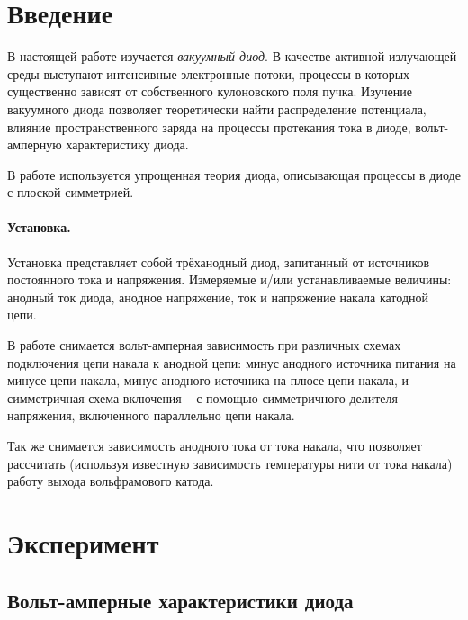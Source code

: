\documentclass[a5paper,11pt]{extarticle}
\begin{document}


\tableofcontents
\newpage



\section*{Введение}
\vspace{-0.5em}
В настоящей работе изучается \textit{вакуумный диод}. В качестве активной излучающей среды выступают интенсивные электронные потоки, процессы в которых существенно зависят от собственного кулоновского поля пучка. Изучение вакуумного диода позволяет теоретически найти распределение потенциала, влияние пространственного заряда на процессы протекания тока в диоде, вольт-амперную характеристику диода. 

В работе используется упрощенная теория диода, описывающая процессы в диоде с плоской симметрией.



\vspace{-0.5em}

\paragraph{Установка.} Установка представляет собой трёханодный диод, запитанный от источников постоянного тока и напряжения. Измеряемые и/или устанавливаемые величины: анодный ток диода, анодное напряжение, ток и напряжение накала катодной цепи.

В работе снимается вольт-амперная зависимость при различных схемах подключения цепи накала к анодной цепи: минус анодного источника питания на минусе цепи накала, минус анодного источника на плюсе цепи накала, и симметричная схема включения -- с помощью симметричного делителя напряжения, включенного параллельно цепи накала.

Так же снимается зависимость анодного тока от тока накала, что позволяет рассчитать (используя известную зависимость температуры нити от тока накала) работу выхода вольфрамового катода.

\newpage


\section{Эксперимент}
\subsection{Вольт-амперные характеристики диода}
\end{document}
